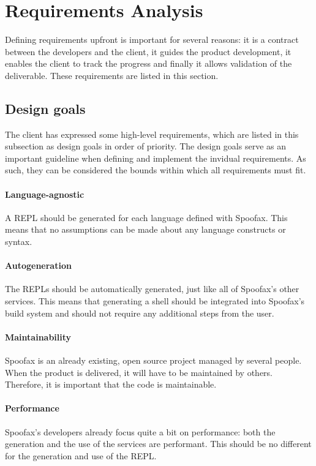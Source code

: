 \section{Requirements Analysis}
\label{sec:requirement-analysis}

Defining requirements upfront is important for several reasons: it is a contract
between the developers and the client, it guides the product development, it
enables the client to track the progress and finally it allows validation of the
deliverable. These requirements are listed in this section.

\subsection{Design goals}
\label{ssec:goals}

The client has expressed some high-level requirements, which are listed in this
subsection as design goals in order of priority. The design goals serve as an
important guideline when defining and implement the invidual requirements. As
such, they can be considered the bounds within which all requirements must fit.

\paragraph{Language-agnostic} A REPL should be generated for each language
defined with Spoofax. This means that no assumptions can be made about any
language constructs or syntax.

\paragraph{Autogeneration} The REPLs should be automatically generated, just
like all of Spoofax's other services. This means that generating a shell should
be integrated into Spoofax's build system and should not require any additional
steps from the user.

\paragraph{Maintainability} Spoofax is an already existing, open source project
managed by several people. When the product is delivered, it will have to be
maintained by others. Therefore, it is important that the code is maintainable.

\paragraph{Performance} Spoofax's developers already focus quite a bit on
performance: both the generation and the use of the services are performant.
This should be no different for the generation and use of the REPL.


